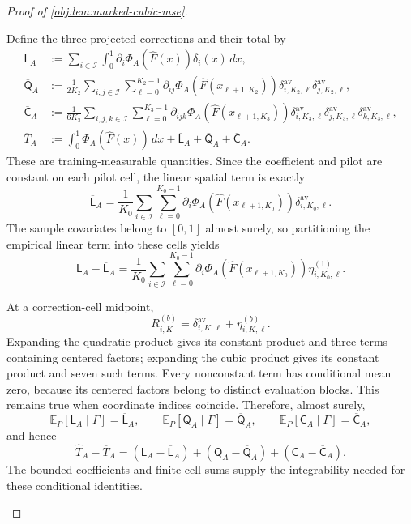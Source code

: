 \documentclass[11pt]{article}
\begin{document}
\begin{proof}[Proof of \cref{obj:lem:marked-cubic-mse}]
\begin{enumerate}
Define the three projected corrections and their total by
\[
\begin{aligned}
\overline{\mathsf L}_A
&:=\sum_{i\in\mathcal I}\int_0^1
\partial_i\Phi_A(\widehat F(x))\delta_i(x)\,dx,\\
\overline{\mathsf Q}_A
&:=\frac1{2K_2}
\sum_{i,j\in\mathcal I}\sum_{\ell=0}^{K_2-1}
\partial_{ij}\Phi_A(\widehat F(x_{\ell+1,K_2}))
\delta^{\mathrm{av}}_{i,K_2,\ell}
\delta^{\mathrm{av}}_{j,K_2,\ell},\\
\overline{\mathsf C}_A
&:=\frac1{6K_3}
\sum_{i,j,k\in\mathcal I}\sum_{\ell=0}^{K_3-1}
\partial_{ijk}\Phi_A(\widehat F(x_{\ell+1,K_3}))
\delta^{\mathrm{av}}_{i,K_3,\ell}
\delta^{\mathrm{av}}_{j,K_3,\ell}
\delta^{\mathrm{av}}_{k,K_3,\ell},\\
\overline T_A
&:=\int_0^1\Phi_A(\widehat F(x))\,dx
+\overline{\mathsf L}_A+\overline{\mathsf Q}_A
+\overline{\mathsf C}_A.
\end{aligned}
\]
These are training-measurable quantities. Since the coefficient and pilot are constant on each pilot cell, the linear spatial term is exactly
\[
\overline{\mathsf L}_A
=
\frac1{K_0}\sum_{i\in\mathcal I}\sum_{\ell=0}^{K_0-1}
\partial_i\Phi_A(\widehat F(x_{\ell+1,K_0}))
\delta^{\mathrm{av}}_{i,K_0,\ell}.
\]
The sample covariates belong to \([0,1]\) almost surely, so partitioning the empirical linear term into these cells yields
\[
\mathsf L_A-\overline{\mathsf L}_A
=
\frac1{K_0}\sum_{i\in\mathcal I}\sum_{\ell=0}^{K_0-1}
\partial_i\Phi_A(\widehat F(x_{\ell+1,K_0}))
\eta^{(1)}_{i,K_0,\ell}.
\]

At a correction-cell midpoint,
\[
R^{(b)}_{i,K}
=\delta^{\mathrm{av}}_{i,K,\ell}
+\eta^{(b)}_{i,K,\ell}.
\]
Expanding the quadratic product gives its constant product and three terms containing centered factors; expanding the cubic product gives its constant product and seven such terms. Every nonconstant term has conditional mean zero, because its centered factors belong to distinct evaluation blocks. This remains true when coordinate indices coincide. Therefore, almost surely,
\[
\mathbb E_P[\mathsf L_A\mid\Gamma]=\overline{\mathsf L}_A,\qquad
\mathbb E_P[\mathsf Q_A\mid\Gamma]=\overline{\mathsf Q}_A,\qquad
\mathbb E_P[\mathsf C_A\mid\Gamma]=\overline{\mathsf C}_A,
\]
and hence
\[
\widehat T_A-\overline T_A
=
(\mathsf L_A-\overline{\mathsf L}_A)
+(\mathsf Q_A-\overline{\mathsf Q}_A)
+(\mathsf C_A-\overline{\mathsf C}_A).
\]
The bounded coefficients and finite cell sums supply the integrability needed for these conditional identities.


\end{enumerate}
\end{proof}
\end{document}
